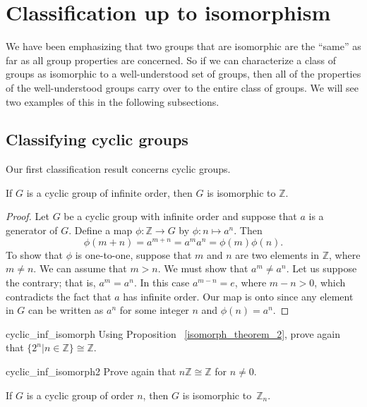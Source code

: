 \section{Classification up to isomorphism}
We have been emphasizing that two groups that are isomorphic are the ``same'' as far as all group properties are concerned. So if we can characterize a class of groups as isomorphic to a well-understood set of groups, then all of the properties of the well-understood groups carry over to the entire class of groups. We will see two examples of this in the following subsections.

\subsection{Classifying cyclic groups}\label{ClassificationOfCylic}

Our first classification result concerns cyclic groups.

\begin{thm}\label{isomorph_theorem_2}
If $G$ is a  cyclic group of infinite order, then $G$ is isomorphic to ${\mathbb Z}$.
\end{thm}

\begin{proof}
Let $G$ be a cyclic group with infinite order and suppose that $a$ is a generator of $G$.  Define a map $\phi : {\mathbb Z} \rightarrow  G$ by $\phi : n \mapsto a^n$. Then 
\[
\phi( m+n ) = a^{m+n} = a^m a^n = \phi( m ) \phi( n ).
\]
To show that $\phi$ is one-to-one, suppose that $m$ and $n$ are two elements in ${\mathbb Z}$, where $m \neq n$.  We can assume that $m > n$.  We must show that $a^m \neq a^n$. Let us suppose the contrary; that is, $a^m = a^n$. In this case $a^{m - n} = e$, where $m - n>0$, which contradicts the fact that $a$ has infinite order.  Our map is onto since any element in $G$ can be written as $a^n$ for some integer $n$ and $\phi(n) = a^n$.   
\end{proof}

\begin{exercise}{cyclic_inf_isomorph}
Using Proposition ~\ref{isomorph_theorem_2}, prove again that $\{2^n | n \in {\mathbb Z} \} \cong {\mathbb Z}$.
\end{exercise}

\begin{exercise}{cyclic_inf_isomorph2}
Prove again that $n{\mathbb Z} \cong {\mathbb Z}$ for $n \neq 0$.
\end{exercise}


\begin{thm}\label{isomorph_theorem_3}
If $G$ is a cyclic group of order $n$, then $G$ is isomorphic to~${\mathbb Z}_n$.  
\end{thm}
 
